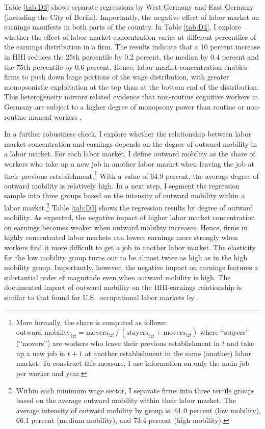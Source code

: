 \documentclass[11pt,oneside,reqno,xcolor=dvipsnames]{article} %
\begin{document}
Table \ref{tab:D3} shows separate regressions by West Germany and East Germany (including the City of Berlin). Importantly, the negative effect of labor market on earnings manifests in both parts of the country. In Table \ref{tab:D4}, I explore whether the effect of labor market concentration varies at different percentiles of the earnings distribution in a firm. The results indicate that a 10 percent increase in HHI reduces the 25th percentile by 0.2 percent, the median by 0.4 percent and the 75th percentile by 0.6 percent. Hence, labor market concentration enables firms to push down large portions of the wage distribution, with greater monopsonistic exploitation at the top than at the bottom end of the distribution. This heterogeneity mirrors related evidence that non-routine cognitive workers in Germany are subject to a higher degree of monopsony power than routine or non-routine manual workers \citep{BachmannEtAl2021}.

In a further robustness check, I explore whether the relationship between labor market concentration and earnings depends on the degree of outward mobility in a labor market. For each labor market, I define outward mobility as the share of workers who take up a new job in another labor market when leaving the job at their previous establishment.\footnote{More formally, the share is computed as follows: $\text{outward mobility}_{izt} = \text{movers}_{izt} \,/\, (\text{stayers}_{izt} + \text{movers}_{izt})$ where ``stayers'' (``movers'') are workers who leave their previous establishment in $t$ and take up a new job in $t+1$ at another establishment in the same (another) labor market. To construct this measure, I use information on only the main job per worker and year.} With a value of 64.9 percent, the average degree of outward mobility is relatively high. In a next step, I segment the regression sample into three groups based on the intensity of outward mobility within a labor market.\footnote{Within each minimum wage sector, I separate firms into three tercile groups based on the average outward mobility within their labor market. The average intensity of outward mobility by group is: 61.0 percent (low mobility), 66.1 percent (medium mobility), and 73.4 percent (high mobility).} Table \ref{tab:D5} shows the regression results by degree of outward mobility. As expected, the negative impact of higher labor market concentration on earnings becomes weaker when outward mobility increases. Hence, firms in highly concentrated labor markets can lowers earnings more strongly when workers find it more difficult to get a job in another labor market. The elasticity for the low mobility group turns out to be almost twice as high as in the high mobility group. Importantly, however, the negative impact on earnings features a substantial order of magnitude even when outward mobility is high. The documented impact of outward mobility on the HHI-earnings relationship is similar to that found for U.S.\ occupational labor markets by \citet{SchubertEtAl2020}.
\end{document}
